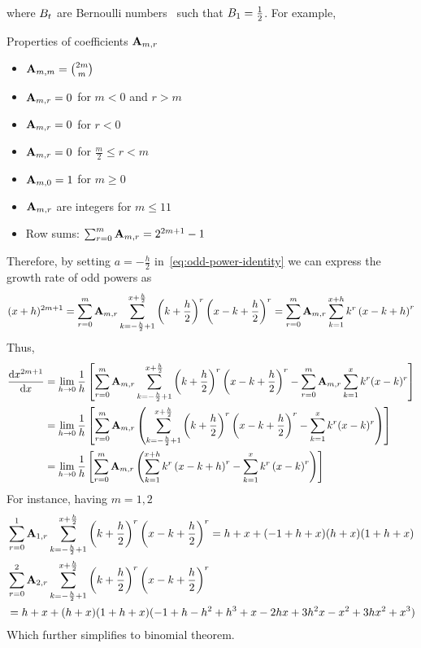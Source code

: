 where ${B}\sb{t}$ are Bernoulli numbers~\cite{bateman1953higher} such that ${B}\sb{1}=\frac{1}{2}$.
For example,

Properties of coefficients ${\mathbf{A}} \sb{m,r}$
\begin{itemize}
    \item ${\mathbf{A}} \sb{m,m} = \binom{2m}{m}$
    \item ${\mathbf{A}} \sb{m,r} = 0$ for $m < 0$ and $r > m$
    \item ${\mathbf{A}} \sb{m,r} = 0$ for $r < 0$
    \item ${\mathbf{A}} \sb{m,r} = 0$ for $\frac{m}{2} \leq r < m$
    \item ${\mathbf{A}} \sb{m,0} = 1$ for $m \geq 0$
    \item ${\mathbf{A}} \sb{m,r}$ are integers for $m \leq 11$
    \item Row sums: $\sum_{r=0}^{m} {\mathbf{A}} \sb{m,r} = 2^{2m+1} - 1$
\end{itemize}
Therefore, by setting $a=-\frac{h}{2}$ in~\eqref{eq:odd-power-identity} we can express the growth rate of odd powers as
\begin{align*}
(x+h)
    ^{2m+1}
    = \sum_{r=0}^{m} {\mathbf{A}} \sb{m,r} \sum_{k=-\frac{h}{2}+1}^{x+\frac{h}{2}} \left( k+\frac{h}{2} \right)^{r} \left(x-k+\frac{h}{2} \right)^{r}
    = \sum_{r=0}^{m} {\mathbf{A}} \sb{m,r} \sum_{k=1}^{x+h} k^r \left(x-k+h \right)^{r}
\end{align*}
Thus,
\begin{align*}
    \odv{x^{2m+1}}{x}
    &= \lim_{h \to 0} \frac{1}{h} \left[ \sum_{r=0}^{m} \coeffA{m}{r} \sum_{k=-\frac{h}{2}+1}^{x+\frac{h}{2}} \left( k+\frac{h}{2} \right)^{r} \left(x-k+\frac{h}{2} \right)^{r}- \sum_{r=0}^{m} \coeffA{m}{r} \sum_{k=1}^{x} k^r (x-k)^r\right] \\
    &= \lim_{h \to 0} \frac{1}{h} \left[ \sum_{r=0}^{m} \coeffA{m}{r} \left( \sum_{k=-\frac{h}{2}+1}^{x+\frac{h}{2}} \left( k+\frac{h}{2} \right)^{r} \left(x-k+\frac{h}{2} \right)^{r}- \sum_{k=1}^{x} k^r (x-k)^r \right) \right] \\
    &= \lim_{h \to 0} \frac{1}{h} \left[ \sum_{r=0}^{m} \coeffA{m}{r} \left( \sum_{k=1}^{x+h} k^r \left(x-k+h \right)^{r} - \sum_{k=1}^{x} k^r \left(x-k \right)^{r} \right) \right]
\end{align*}
For instance, having $m=1,2$
\begin{align*}
    &\sum_{r=0}^{1} {\mathbf{A}} \sb{1,r} \sum_{k=-\frac{h}{2}+1}^{x+\frac{h}{2}} \left( k+\frac{h}{2} \right)^{r} \left(x-k+\frac{h}{2} \right)^{r}
    = h + x + (-1 + h + x) (h + x) (1 + h + x) \\
    &\sum_{r=0}^{2} {\mathbf{A}} \sb{2,r} \sum_{k=-\frac{h}{2}+1}^{x+\frac{h}{2}} \left( k+\frac{h}{2} \right)^{r} \left(x-k+\frac{h}{2} \right)^{r} \\
    &= h + x + (h + x) (1 + h + x) (-1 + h - h^2 + h^3 + x - 2 h x + 3 h^2 x - x^2 + 3 h x^2 + x^3)
\end{align*}
Which further simplifies to binomial theorem.
